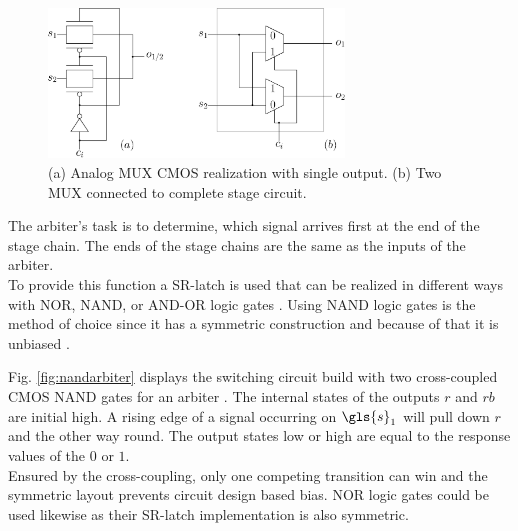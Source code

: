 \begin{figure}[ht]
\centering
\includegraphics[width=0.70\textwidth]{images/stage_circuit.eps}
\caption[Analog \acs{MUX} and stage circuit]{(a) Analog \ac{MUX} \ac{CMOS} realization with single output.
(b) Two \acs{MUX} connected to complete stage circuit.}
\label{fig:multiplexer}
\end{figure}

The arbiter's task is to determine, which signal arrives first at the end of the stage chain.
The ends of the stage chains are the same as the inputs of the arbiter.\\
To provide this function a \ac{SR-latch} is used that can be realized in different ways with NOR, NAND, or AND-OR logic gates \cite{2016Flip-flopWikipedia}.
Using NAND logic gates is the method of choice since it has a symmetric construction and because of that it is unbiased \cite{Lin2010Low-powerFunctions,Maes2013PhysicallyApplications}.

Fig. \ref{fig:nandarbiter} displays the switching circuit build with two cross-coupled \ac{CMOS} NAND gates for an arbiter \cite{2016NANDWikipedia}.
The internal states of the outputs $r$ and $rb$ are initial high. 
A rising edge of a signal occurring on $\gls{s}_1$ will pull down $r$ and the other way round.
The output states low or high are equal to the response values of the \puf $0$ or $1$.\\
Ensured by the cross-coupling, only one competing transition can win and the symmetric layout prevents circuit design based bias.
NOR logic gates could be used likewise as their \ac{SR-latch} implementation is also symmetric.

